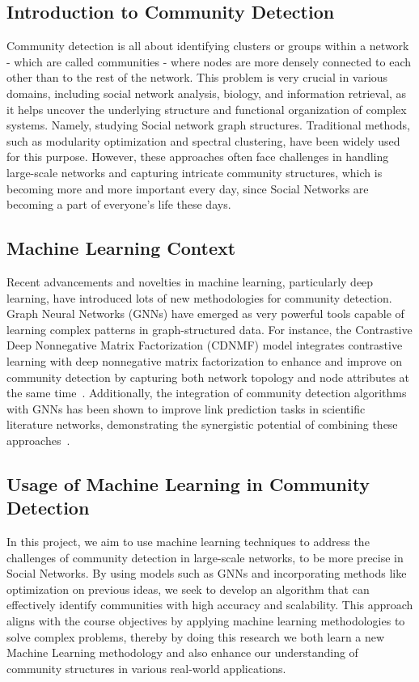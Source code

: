 \documentclass{article}
\begin{document}
\subsection{Introduction to Community Detection}
Community detection is all about identifying clusters or groups within a network - which are called communities - where nodes are more densely connected to each other than to the rest of the network. This problem is very crucial in various domains, including social network analysis, biology, and information retrieval, as it helps uncover the underlying structure and functional organization of complex systems. Namely, studying Social network graph structures. Traditional methods, such as modularity optimization and spectral clustering, have been widely used for this purpose. However, these approaches often face challenges in handling large-scale networks and capturing intricate community structures, which is becoming more and more important every day, since Social Networks are becoming a part of everyone's life these days.

\subsection{Machine Learning Context}
Recent advancements and novelties in machine learning, particularly deep learning, have introduced lots of new methodologies for community detection. Graph Neural Networks (GNNs) have emerged as very powerful tools capable of learning complex patterns in graph-structured data. For instance, the Contrastive Deep Nonnegative Matrix Factorization (CDNMF) model integrates contrastive learning with deep nonnegative matrix factorization to enhance and improve on community detection by capturing both network topology and node attributes at the same time~\cite{li2024contrastivedeepnonnegativematrix}. Additionally, the integration of community detection algorithms with GNNs has been shown to improve link prediction tasks in scientific literature networks, demonstrating the synergistic potential of combining these approaches~\cite{liu2024communitydetectiongraphneural}.

\subsection{Usage of Machine Learning in Community Detection}
In this project, we aim to use machine learning techniques to address the challenges of community detection in large-scale networks, to be more precise in Social Networks. By using models such as GNNs and incorporating methods like optimization on previous ideas, we seek to develop an algorithm that can effectively identify communities with high accuracy and scalability. This approach aligns with the course objectives by applying machine learning methodologies to solve complex problems, thereby by doing this research we both learn a new Machine Learning methodology and also enhance our understanding of community structures in various real-world applications.
\end{document}
